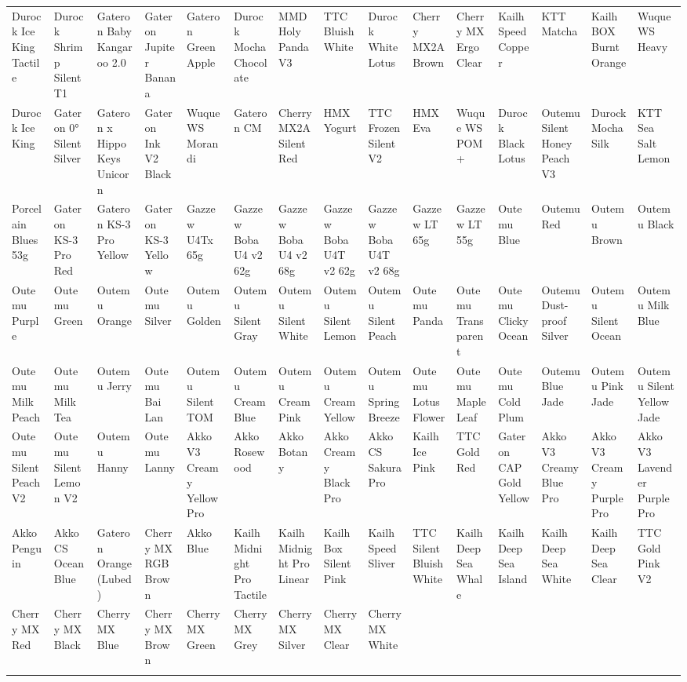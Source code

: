 \documentclass[a4paper]{article}
\begin{document}
\pagestyle{empty}
\begin{center}
\fontsize{7}{9}\selectfont
{\selectfont
\begin{tabular}{ : *{15}{C{1.19cm}:} }
\hdashline
Durock Ice King Tactile & Durock Shrimp Silent T1 & Gateron Baby Kangaroo 2.0 & Gateron Jupiter Banana & Gateron Green Apple & Durock Mocha Chocolate & MMD Holy Panda V3 & TTC Bluish White & Durock White Lotus & Cherry MX2A Brown & Cherry MX Ergo Clear & Kailh Speed Copper & KTT Matcha & Kailh BOX Burnt Orange & Wuque WS Heavy \\ 
\hdashline
Durock Ice King & Gateron 0° Silent Silver & Gateron x HippoKeys Unicorn & Gateron Ink V2 Black & Wuque WS Morandi & Gateron CM & Cherry MX2A Silent Red & HMX Yogurt & TTC Frozen Silent V2 & HMX Eva & Wuque WS POM+ & Durock Black Lotus & Outemu Silent Honey Peach V3 & Durock Mocha Silk & KTT Sea Salt Lemon \\ 
\hdashline
Porcelain Blues 53g & Gateron KS-3 Pro Red & Gateron KS-3 Pro Yellow & Gateron KS-3 Yellow & Gazzew U4Tx 65g & Gazzew Boba U4 v2 62g & Gazzew Boba U4 v2 68g & Gazzew Boba U4T v2 62g & Gazzew Boba U4T v2 68g & Gazzew LT 65g & Gazzew LT 55g & Outemu Blue & Outemu Red & Outemu Brown & Outemu Black \\ 
\hdashline
Outemu Purple & Outemu Green & Outemu Orange & Outemu Silver & Outemu Golden & Outemu Silent Gray & Outemu Silent White & Outemu Silent Lemon & Outemu Silent Peach & Outemu Panda & Outemu Transparent & Outemu Clicky Ocean & Outemu Dust-proof Silver & Outemu Silent Ocean & Outemu Milk Blue \\ 
\hdashline
Outemu Milk Peach & Outemu Milk Tea & Outemu Jerry & Outemu Bai Lan & Outemu Silent TOM & Outemu Cream Blue & Outemu Cream Pink & Outemu Cream Yellow & Outemu Spring Breeze & Outemu Lotus Flower & Outemu Maple Leaf & Outemu Cold Plum & Outemu Blue Jade & Outemu Pink Jade & Outemu Silent Yellow Jade \\ 
\hdashline
Outemu Silent Peach V2 & Outemu Silent Lemon V2 & Outemu Hanny & Outemu Lanny & Akko V3 Creamy Yellow Pro & Akko Rosewood & Akko Botany & Akko Creamy Black Pro & Akko CS Sakura Pro & Kailh Ice Pink & TTC Gold Red & Gateron CAP Gold Yellow & Akko V3 Creamy Blue Pro & Akko V3 Creamy Purple Pro & Akko V3 Lavender Purple Pro \\ 
\hdashline
Akko Penguin & Akko CS Ocean Blue & Gateron Orange (Lubed) & Cherry MX RGB Brown & Akko Blue & Kailh Midnight Pro Tactile & Kailh Midnight Pro Linear & Kailh Box Silent Pink & Kailh Speed Sliver & TTC Silent Bluish White & Kailh Deep Sea Whale & Kailh Deep Sea Island & Kailh Deep Sea White & Kailh Deep Sea Clear & TTC Gold Pink V2 \\ 
\hdashline
Cherry MX Red & Cherry MX Black & Cherry MX Blue & Cherry MX Brown & Cherry MX Green & Cherry MX Grey & Cherry MX Silver & Cherry MX Clear & Cherry MX White &  &  &  &  &  &  \\ 
\hdashline
\end{tabular}
}
\end{center}
\end{document}
